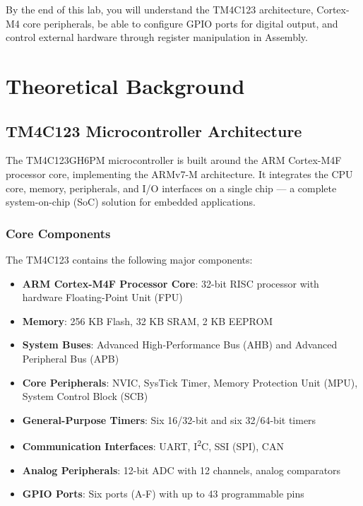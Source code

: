 By the end of this lab, you will understand the TM4C123 architecture, Cortex-M4 core peripherals, be able to configure GPIO ports for digital output, and control external hardware through register manipulation in Assembly.

\newpage
{}
\localtableofcontents
\bigskip
\newpage

\section{Theoretical Background}

\subsection{TM4C123 Microcontroller Architecture}

The TM4C123GH6PM microcontroller is built around the ARM Cortex-M4F processor core, implementing the ARMv7-M architecture. It integrates the CPU core, memory, peripherals, and I/O interfaces on a single chip — a complete system-on-chip (SoC) solution for embedded applications.

\subsubsection{Core Components}

The TM4C123 contains the following major components:
\begin{itemize}[nosep]
  \item \textbf{ARM Cortex-M4F Processor Core}: 32-bit RISC processor with hardware Floating-Point Unit (FPU)
  \item \textbf{Memory}: 256 KB Flash, 32 KB SRAM, 2 KB EEPROM
  \item \textbf{System Buses}: Advanced High-Performance Bus (AHB) and Advanced Peripheral Bus (APB)
  \item \textbf{Core Peripherals}: NVIC, SysTick Timer, Memory Protection Unit (MPU), System Control Block (SCB)
  \item \textbf{General-Purpose Timers}: Six 16/32-bit and six 32/64-bit timers
  \item \textbf{Communication Interfaces}: UART, I\textsuperscript{2}C, SSI (SPI), CAN
  \item \textbf{Analog Peripherals}: 12-bit ADC with 12 channels, analog comparators
  \item \textbf{GPIO Ports}: Six ports (A-F) with up to 43 programmable pins
\end{itemize}

